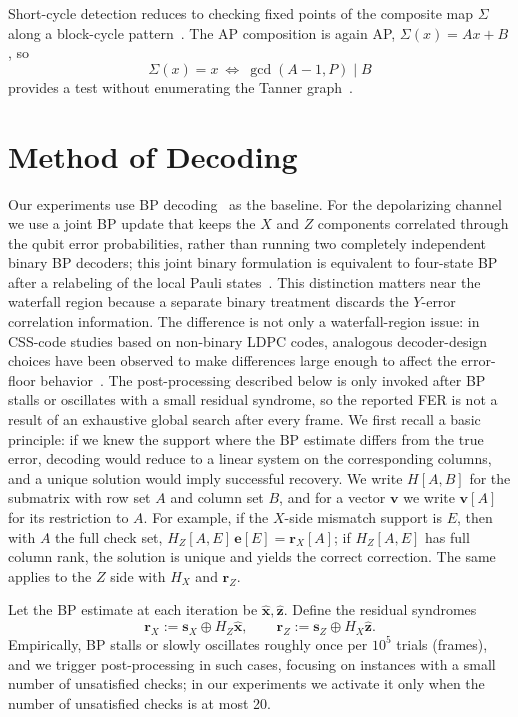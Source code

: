 \documentclass[a4paper,onecolumn,11pt,accepted=2026-08-03]{quantumarticle}
\renewcommand\[{\begin{equation}}
\renewcommand\]{\end{equation}}
\theoremstyle{definition}
\begin{document}
Short-cycle detection reduces to checking fixed points of the composite map $\Sigma$ along a block-cycle pattern~\cite{Fossorier2004,Gholami2015}. The AP composition is again AP, $\Sigma(x)=Ax+B$, so
\begin{equation*}
  \Sigma(x)=x\ \Longleftrightarrow\ \gcd(A-1,P)\mid B
\end{equation*}
provides a test without enumerating the Tanner graph~\cite{Gholami2015}.

\section{Method of Decoding}
Our experiments use BP decoding~\cite{MacKay2004,PoulinChung2008} as the baseline.
 {For the depolarizing channel we use a joint BP update that keeps the $X$ and $Z$ components correlated through the qubit error probabilities, rather than running two completely independent binary BP decoders; this joint binary formulation is equivalent to four-state BP after a relabeling of the local Pauli states~\cite{Kasai2026JointFourStateBP}.
This distinction matters near the waterfall region because a separate binary treatment discards the $Y$-error correlation information.
The difference is not only a waterfall-region issue: in CSS-code studies based on non-binary LDPC codes, analogous decoder-design choices have been observed to make differences large enough to affect the error-floor behavior~\cite{KasaiHagiwaraImaiSakaniwa2012,KomotoKasai2025}.
The post-processing described below is only invoked after BP stalls or oscillates with a small residual syndrome, so the reported FER is not a result of an exhaustive global search after every frame.}
 We first recall a basic principle: if we knew the support where the BP estimate differs from the true error, decoding would reduce to a linear system on the corresponding columns, and a unique solution would imply successful recovery. We write $H[A,B]$ for the submatrix with row set $A$ and column set $B$, and for a vector $\boldsymbol{v}$ we write $\boldsymbol{v}[A]$ for its restriction to $A$. For example, if the $X$-side mismatch support is $E$, then with $A$ the full check set, $H_Z[A,E]\,\boldsymbol{e}[E]=\boldsymbol{r}_X[A]$; if $H_Z[A,E]$ has full column rank, the solution is unique and yields the correct correction. The same applies to the $Z$ side with $H_X$ and $\boldsymbol{r}_Z$.

Let the BP estimate at each iteration be $\boldsymbol{\hat{x}},\boldsymbol{\hat{z}}$. Define the residual syndromes
\begin{equation*}
\boldsymbol{r}_X:=\boldsymbol{s}_X\oplus H_Z\boldsymbol{\hat{x}},\qquad
\boldsymbol{r}_Z:=\boldsymbol{s}_Z\oplus H_X\boldsymbol{\hat{z}}.
\end{equation*}
Empirically, BP stalls or slowly oscillates roughly once per $10^5$ trials (frames), and we trigger post-processing in such cases, focusing on instances with a small number of unsatisfied checks; in our experiments we activate it only when the number of unsatisfied checks is at most 20.
\end{document}
